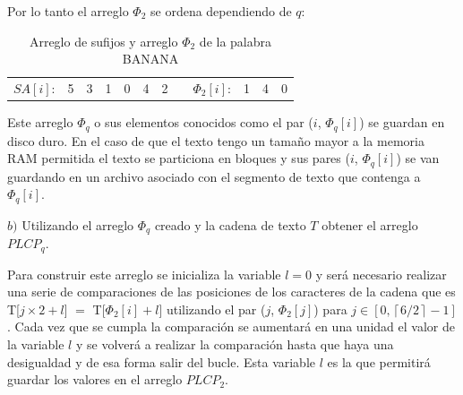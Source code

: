 \newpage

Por lo tanto el arreglo $\Phi_{2}$ se ordena dependiendo de $q$:

\begin{table}[!htb]
\centering
\begin{tabular}{c|c|c|c|c|c|c|cc|c|c|c|}
\cline{2-7} \cline{10-12}
$SA[i]$: & 5 & 3 & 1 & 0 & 4 & 2 &  & $\Phi_{2}[i]$: & 1 & 4 & 0 \\ \cline{2-7} \cline{10-12} 
\end{tabular}
\caption{Arreglo de sufijos y arreglo $\Phi_{2}$ de la palabra BANANA}
\end{table}


Este arreglo $\Phi_{q}$ o sus elementos conocidos como el par ($i$, $\Phi_{q}[i]$) se guardan en disco duro. En el caso de que el texto tengo un tamaño mayor a la memoria RAM permitida el texto se particiona en bloques y sus pares ($i$, $\Phi_{q}[i]$) se van guardando en un archivo asociado con el segmento de texto que contenga a $\Phi_{q}[i]$.

$b)$ Utilizando el arreglo $\Phi_{q}$ creado y la cadena de texto $T$ obtener el arreglo $PLCP_{q}$.

Para construir este arreglo se inicializa la variable $l=0$ y será necesario realizar una serie de comparaciones de las posiciones de los caracteres de la cadena que es T[$j \times 2+l$] $=$ T[$\Phi_{2}[i]+l$] utilizando el par ($j$, $\Phi_{2}[j]$) para $j \in [0, \left \lceil{6/2}\right \rceil - 1]$. Cada vez que se cumpla la comparación se aumentará en una unidad el valor de la variable $l$ y se volverá a realizar la comparación hasta que haya una desigualdad y de esa forma salir del bucle. Esta variable $l$ es la que permitirá guardar los valores en el arreglo $PLCP_{2}$.

